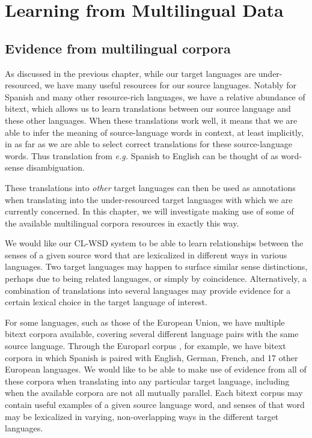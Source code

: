 \chapter{Learning from Multilingual Data}
\label{chap:multilingual}

\section{Evidence from multilingual corpora}
As discussed in the previous chapter, while our target languages are
under-resourced, we have many useful resources for our source languages.
Notably for Spanish and many other resource-rich languages, we have a relative
abundance of bitext, which allows us to learn translations between our source
language and these other languages.
When these translations work well, it means that we are able to infer the
meaning of source-language words in context, at least implicitly, in as far as
we are able to select correct translations for these source-language words.
Thus translation from \emph{e.g.} Spanish to English can be thought of as
word-sense disambiguation.

These translations into \emph{other} target languages can then be used as
annotations when translating into the under-resourced target languages with
which we are currently concerned. In this chapter, we will investigate making
use of some of the available multilingual corpora resources in exactly this way.

We would like our CL-WSD system to be able to learn relationships between the
senses of a given source word that are lexicalized in different ways in various
languages.
Two target languages may happen to surface similar sense distinctions, perhaps
due to being related languages, or simply by coincidence. Alternatively, a
combination of translations into several languages may provide evidence for a
certain lexical choice in the target language of interest.

For some languages, such as those of the European Union, we have multiple
bitext corpora available, covering several different language pairs with the
same source language. Through the Europarl corpus \cite{europarl}, for example,
we have bitext corpora in which Spanish is paired with English, German, French,
and 17 other European languages.
We would like to be able to make use of evidence from all of these corpora when
translating into any particular target language, including when the available
corpora are not all mutually parallel.
Each bitext corpus may contain useful examples of a given source language word,
and senses of that word may be lexicalized in varying, non-overlapping ways in
the different target languages.


